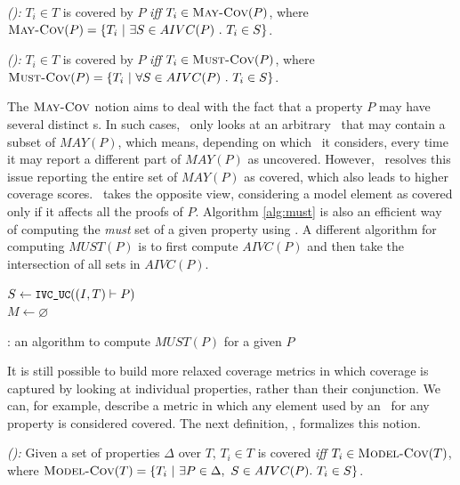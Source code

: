 \begin{definition} {\emph{(\maycov):}}
  \label{def:comp-1}
 $T_i \in T$ is covered by $P$ \emph{iff} $T_i \in \text{\sc May-Cov} (P)$, where
   $\text{\sc May-Cov} (P) = \{T_i ~|~ \exists S \in AIVC(P)~.~T_i \in S \}$.
\end{definition}

\begin{definition} {\emph{(\mustcov):}}
  \label{def:mustcov}
 $T_i \in T$ is covered by $P$ \emph{iff} $T_i \in \text{\sc Must-Cov} (P)$, where
   $\text{\sc Must-Cov} (P) = \{T_i ~|~ \forall S \in AIVC(P)~.~T_i \in S \}$.
\end{definition}

The $\text{\sc May-Cov}$ notion aims to deal with the fact that a property $P$ may have
several distinct {\mivc}s. In such cases, \ivccov\ only looks at an arbitrary \mivc\
that may contain a subset of $MAY(P)$, which means, depending on
which \mivc\ it considers, every time it may report a different part of $MAY(P)$
as uncovered. However, \maycov\ resolves this issue reporting the entire set of $MAY(P)$ as covered, which also leads to higher coverage scores.  \mustcov\ takes the opposite view, considering a model element as covered only if it affects all the proofs of $P$.
Algorithm \ref{alg:must} is also an efficient way of computing the \emph{must} set of a given property using \ucalg. A different algorithm for computing $MUST (P)$ is to first compute $AIVC (P)$ and then take the intersection of all sets in $AIVC (P)$.


\begin{algorithm}
  \BlankLine
  $S \leftarrow \texttt{\small{IVC\_UC}}((I, T) \vdash P)$ \\
  $M \leftarrow \varnothing$ \\
   {
  }
\caption{\mustalg: an algorithm to compute $MUST(P)$ for a given $P$}
\label{alg:must}
\end{algorithm}

It is still possible to build more relaxed coverage metrics in which coverage
is captured by looking at individual properties, rather than their conjunction.
We can, for example, describe a metric in which any element used by an \mivc ~for any property is considered covered.
%
The next definition, \allcov, formalizes this notion.
\begin{definition} {\emph{(\allcov):}}
  \label{def:comp-2}
     Given a set of properties $\Delta$ over $T$, $T_i \in T$ is covered
   \emph{iff} $T_i \in \text{\sc Model-Cov} (T)$, where
   $\text{\sc Model-Cov} (T) = \{T_i ~|~ \exists P \in \Delta ,~ S \in AIVC(P).~T_i \in S \}$.
\end{definition}

